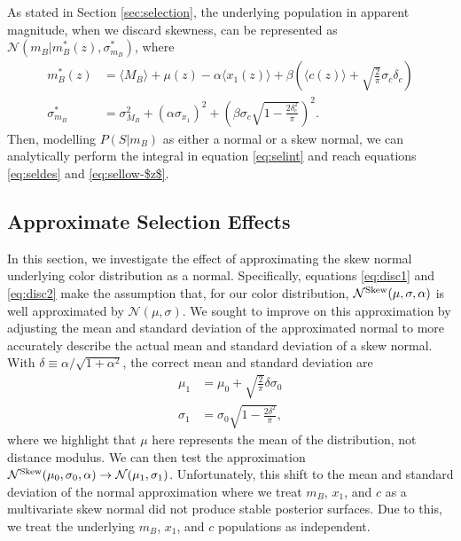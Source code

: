 \documentclass[a4paper,fleqn,usenatbib]{mnras}
\begin{document}
As stated in Section \ref{sec:selection}, the underlying population in apparent magnitude, when we discard skewness, can be represented as $\mathcal{N}(m_B|m_B^*(z), \sigma^*_{m_B})$, where
\begin{align}
m_B^*(z) &= \langle M_B \rangle + \mu(z) - \alpha \langle x_1(z) \rangle + \beta \left(\langle c(z) \rangle + \sqrt{\frac{2}{\pi}}\sigma_c \delta_c\right)\label{eq:disc1} \\
\sigma^*_{m_B} &= \sigma_{M_B}^2 + (\alpha \sigma_{x_1})^2 +  \left(\beta \sigma_c \sqrt{1 - \frac{2\delta_c^2}{\pi}}\right)^2. \label{eq:disc2}
\end{align}
Then, modelling $P(S|m_B)$ as either a normal or a skew normal, we can analytically perform the integral in equation \eqref{eq:selint} and reach equations \eqref{eq:seldes} and \eqref{eq:sellow-$z$}.





\subsection{Approximate Selection Effects}
\label{app:approx}

In this section, we investigate the effect of approximating the skew normal underlying color distribution as a normal. Specifically, equations \eqref{eq:disc1} and \eqref{eq:disc2} make the assumption that, for our color distribution, $\mathcal{N}^{\rm Skew}(\mu, \sigma, \alpha)$ is well approximated by $\mathcal{N}(\mu, \sigma)$. We sought to improve on this approximation by adjusting the mean and standard deviation of the approximated normal to more accurately describe the actual mean and standard deviation of a skew normal. With $\delta \equiv \alpha/\sqrt{1+\alpha^2}$, the correct mean and standard deviation are
\begin{align}
\mu_1 &= \mu_0 + \sqrt{\frac{2}{\pi}} \delta \sigma_0 \\
\sigma_1 &= \sigma_0 \sqrt{1 - \frac{2 \delta^2}{\pi}},
\end{align}
where we highlight that $\mu$ here represents the mean of the distribution, not distance modulus. We can then test the approximation $\mathcal{N}^{\rm Skew}(\mu_0, \sigma_0, \alpha) \rightarrow \mathcal{N}(\mu_1, \sigma_1)$. Unfortunately, this shift to the mean and standard deviation of the normal approximation where we treat $m_B$, $x_1$, and $c$ as a multivariate skew normal did not produce stable posterior surfaces. Due to this, we treat the underlying $m_B$, $x_1$, and $c$ populations as independent. 
\end{document}
